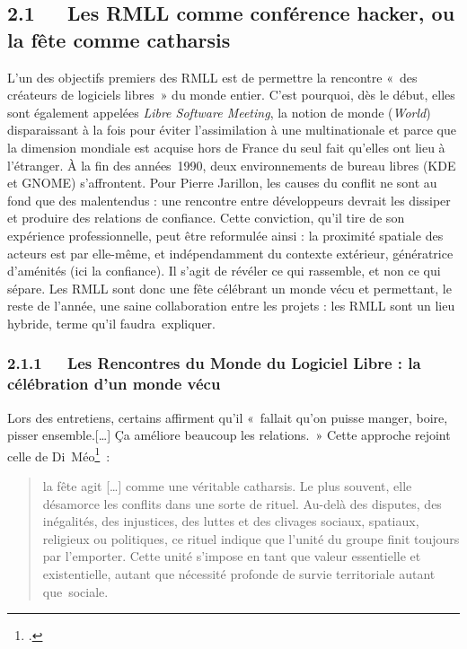 \documentclass{FramateX}
\begin{document}
\begin{refsection}
\subsection*{2.1~~~Les RMLL comme conférence hacker, ou la fête comme catharsis}
{}

L'un des objectifs premiers des RMLL est de permettre la rencontre
«~des créateurs de logiciels libres~» du monde
entier. C'est pourquoi, dès le début, elles sont également appelées
\textit{Libre Software Meeting}, la notion de monde (\textit{World})
disparaissant à la fois pour éviter l'assimilation à une multinationale
et parce que la dimension mondiale est acquise hors de France du seul
fait qu'elles ont lieu à l'étranger. À la fin des années~1990, deux
environnements de bureau libres (KDE et GNOME) s'affrontent. Pour
Pierre Jarillon, les causes du conflit ne sont au fond que des
malentendus : une rencontre entre développeurs devrait les dissiper et
produire des relations de confiance. Cette conviction, qu'il tire de
son expérience professionnelle, peut être reformulée ainsi : la
proximité spatiale des acteurs est par elle-même, et indépendamment du
contexte extérieur, génératrice d'aménités (ici la confiance). Il
s'agit de révéler ce qui rassemble, et non ce qui sépare. Les RMLL sont
donc une fête célébrant un monde vécu et permettant, le reste de
l'année, une saine collaboration entre les projets : les RMLL sont un
lieu hybride, terme qu'il faudra~expliquer.

\subsubsection*{2.1.1~~~Les Rencontres du Monde du Logiciel Libre : la célébration d'un monde vécu}
{}

Lors des entretiens, certains affirment qu'il
«~fallait qu'on puisse manger, boire, pisser
ensemble.[…] Ça
améliore beaucoup les relations.~» Cette approche rejoint celle de
Di~Méo\footnote{\cite[p.~17]{dimeogeographie2001}.}~:

\begin{quote}
la fête agit […] comme une véritable catharsis. Le plus souvent, elle
désamorce les conflits dans une sorte de rituel. Au-delà des disputes,
des inégalités, des injustices, des luttes et des clivages sociaux,
spatiaux, religieux ou politiques, ce rituel indique que l'unité du
groupe finit toujours par l'emporter. Cette unité s'impose en tant que
valeur essentielle et existentielle, autant que nécessité profonde de
survie territoriale autant que~sociale.
\end{quote}


\end{refsection}
\end{document}
